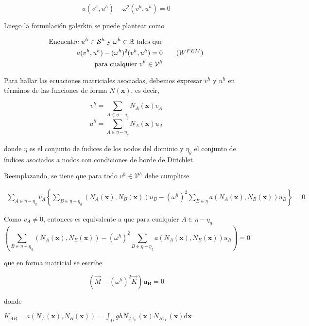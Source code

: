 $$ a(v^h, u^h) - \omega^2 (v^h, u^h) = 0 $$

Luego la formulaci\'on galerkin se puede plantear como

\begin{equation}
  \begin{split}
  \text{Encuentre $u^h\in\mathcal{S}^h$ y $\omega^h \in \mathbb{R}$  tales que} \\
    a(v^h,u^h) - (\omega^h)^2 (v^h,u^h) = 0 \\
    \text{ para cualquier $v^h \in \mathcal{V}^h$}
  \end{split}
  \tag{\text{$W^{FEM}$}}
\end{equation}


Para hallar las ecuaciones matriciales asociadas, debemos expresar $v^h$ y $u^h$ en t\'erminos de las funciones de forma $N(\boldsymbol{x})$, es decir, 

$$v^h = \sum_{A \in \eta-\eta_g}N_A(\boldsymbol{x})v_A$$
$$u^h = \sum_{A \in \eta-\eta_g}N_A(\boldsymbol{x})u_A$$

donde 
$\eta$ es el conjunto de \'indices de los  nodos del dominio y $\eta_g$ el conjunto de \'indices asociados a nodos con condiciones de borde de Dirichlet

Reemplazando, se tiene que para todo $ v^h\in \mathcal{V}^h$ debe cumplirse

\begin{equation*}
\begin{split}
\sum_{A \in \eta-\eta_g} v_A 
\left \{
\sum_{B \in \eta-\eta_g}(N_A(\boldsymbol{x}), N_B(\boldsymbol{x})) u_B - 
(\omega^h)^2 \sum_{B \in \eta} a(N_A(\boldsymbol{x}), N_B(\boldsymbol{x})) u_B 
\right \} = 0
\end{split}
\end{equation*}

Como $v_A \neq 0$, entonces es equivalente a que para cualquier $A\in \eta-\eta_g$
$$\left( \sum_{B \in \eta-\eta_g}(N_A(\boldsymbol{x}), N_B(\boldsymbol{x})) - 
(\omega^h)^2 \sum_{B \in \eta-\eta_g} a(N_A(\boldsymbol{x}), N_B(\boldsymbol{x})) u_B\right) =0 $$

que en forma matricial se escribe 

$$(\vec M - (\omega^h)^2 \vec K)\boldsymbol{u_B} = 0$$

donde 

$K_{AB} = a(N_A(\boldsymbol{x}), N_B(\boldsymbol{x})) = \int_{\Omega} gh N_A,_i(\boldsymbol{x}) N_B,_i(\boldsymbol{x}) \mathrm{d}\boldsymbol{x} $\\

